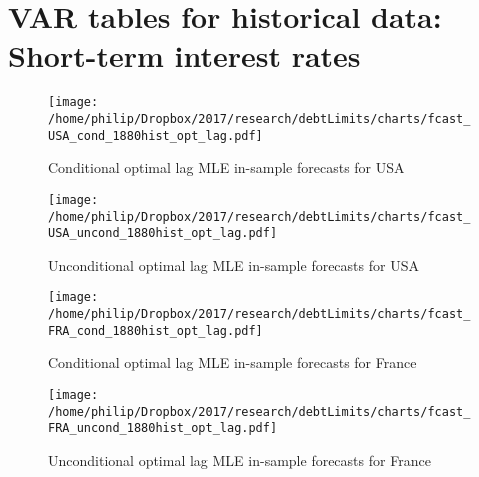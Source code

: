 \documentclass{article}
\begin{document}
\section*{VAR tables for historical data: Short-term interest rates}

	{\def\arraystretch{1.2}\tabcolsep=2pt
		
		
		
		
		
		
		
		
		
		
		
		
		
		
		
		
		
		
		
		
		
		
		
		
		
	}





	\newpage

	\begin{figure}[htbp]
	    \centering
		\texttt{[image: /home/philip/Dropbox/2017/research/debtLimits/charts/fcast\_USA\_cond\_1880hist\_opt\_lag.pdf]}
		\caption{Conditional optimal lag MLE in-sample forecasts for USA}
	\end{figure}
	
	\begin{figure}[htbp]
	    \centering
		\texttt{[image: /home/philip/Dropbox/2017/research/debtLimits/charts/fcast\_USA\_uncond\_1880hist\_opt\_lag.pdf]}
		\caption{Unconditional optimal lag MLE in-sample forecasts for USA}
	\end{figure}
	
	
	\begin{figure}[htbp]
	    \centering
		\texttt{[image: /home/philip/Dropbox/2017/research/debtLimits/charts/fcast\_FRA\_cond\_1880hist\_opt\_lag.pdf]}
		\caption{Conditional optimal lag MLE in-sample forecasts for France}
	\end{figure}
	
	\begin{figure}[htbp]
	    \centering
		\texttt{[image: /home/philip/Dropbox/2017/research/debtLimits/charts/fcast\_FRA\_uncond\_1880hist\_opt\_lag.pdf]}
		\caption{Unconditional optimal lag MLE in-sample forecasts for France}
	\end{figure}
	
\end{document}
